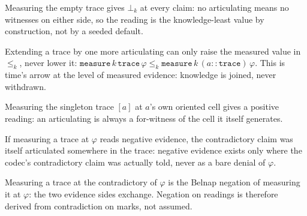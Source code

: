 \begin{theorem}\label{thm:measure-nil}\leanok{}
Measuring the empty trace gives \(\bot_k\) at every claim: no articulating
means no witnesses on either side, so the reading is the knowledge-least
value by construction, not by a seeded default.
\end{theorem}

\begin{theorem}\label{thm:measure-cons-le}\leanok{}
Extending a trace by one more articulating can only raise the measured value
in \(\le_k\), never lower it: \(\texttt{measure}\,k\,\texttt{trace}\,\varphi
\le_k \texttt{measure}\,k\,(a :: \texttt{trace})\,\varphi\). This is time's
arrow at the level of measured evidence: knowledge is joined, never
withdrawn.
\end{theorem}

\begin{theorem}\label{thm:measure-self-pos}\leanok{}
Measuring the singleton trace \([a]\) at \(a\)'s own oriented cell gives a
positive reading: an articulating is always a for-witness of the cell it
itself generates.
\end{theorem}

\begin{theorem}[No denial]\label{thm:no-denial}\leanok{}
If measuring a trace at \(\varphi\) reads negative evidence, the
contradictory claim was itself articulated somewhere in the trace: negative
evidence exists only where the codec's contradictory claim was actually told,
never as a bare denial of \(\varphi\).
\end{theorem}

\begin{theorem}\label{thm:measure-contradictory-negate}\leanok{}
Measuring a trace at the contradictory of \(\varphi\) is the Belnap negation
of measuring it at \(\varphi\): the two evidence sides exchange. Negation on
readings is therefore derived from contradiction on marks, not assumed.
\end{theorem}

